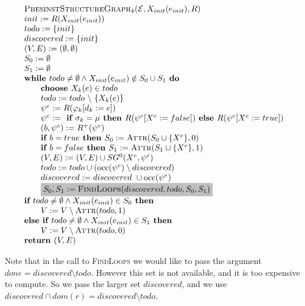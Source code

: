 \documentclass{article}
\newcommand{\Return}{\text{\textbf{return }}}
\begin{document}
\begin{equation*}
\begin{array}{l}
\textsc{PbesinstStructureGraph$_{4}$(}\mathcal{E}, X_{init}(e_{init}), R) \\ 
init:=R(X_{init}(e_{init})) \\
todo:=\{init\} \\
discovered:=\{init\} \\
(V,E) :=(\emptyset ,\emptyset ) \\ 
S_0:= \emptyset \\
S_1:= \emptyset \\
\textbf{while }todo \neq \emptyset \wedge X_{init}(e_{init}) \notin S_0 \cup S_1 \textbf{ do} \\ 
\qquad \text{\textbf{choose }}X_{k}(e)\in todo \\ 
\qquad todo:=todo\ \backslash \ \{X_{k}(e)\} \\ 
\qquad \psi ^{e}:=R(\varphi _{k}[d_{k}:=e]) \\ 
\qquad \psi^e := \textbf{ if } \sigma_k = \mu \textbf{ then } R(\psi^e[X^e := false])
\textbf{ else }  R(\psi^e[X^e := true]) \\
\qquad (b,\psi^e) := R^+(\psi^e) \\
\qquad \textbf{if $b = true$ then } S_0 := \textsc{Attr}(S_0 \cup \{ X^e \}, 0) \\
\qquad \textbf{if $b = false$ then } S_1 := \textsc{Attr}(S_1 \cup \{ X^e \}, 1) \\
\qquad (V,E) := (V,E) \cup SG^{0}(X^{e},\psi ^{e}) \\ 
\qquad todo:=todo\cup (\mathrm{occ}(\psi ^{e})\setminus discovered) \\
\qquad discovered:=discovered\ \cup \mathrm{occ}(\psi ^{e}) \\
\qquad \colorbox{lightgray}{$%
S_0, S_1 := \text{\textsc{FindLoops}}(discovered, todo, S_0, S_1) $}\\  %
\textbf{if } todo \neq \emptyset \land X_{init}(e_{init}) \in S_0 \textbf{ then }\\
\qquad V := V \setminus \textsc{Attr}(todo, 1) \\
\textbf{else if } todo \neq \emptyset \land X_{init}(e_{init}) \in S_1 \textbf{ then }\\
\qquad V := V \setminus \textsc{Attr}(todo, 0) \\
\Return (V, E)
\end{array}%
\end{equation*}%

Note that in the call to \textsc{FindLoops} we would like to pass the argument $done = discovered \setminus todo$.
However this set is not available, and it is too expensive to compute. So we pass the larger set $discovered$, and we use $discovered \cap dom(r) = discovered \setminus todo$.
\end{document}

